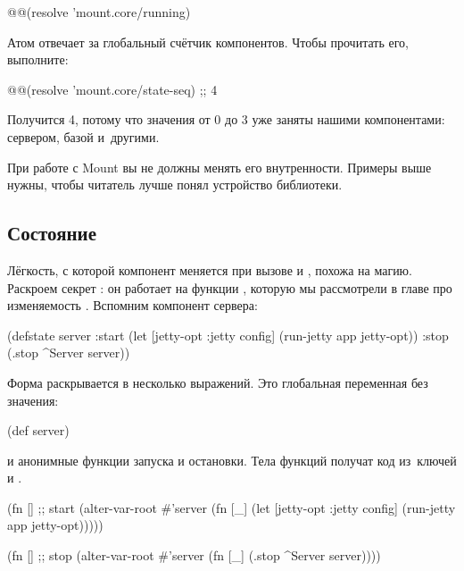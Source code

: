 \begin{clojure}
@@(resolve 'mount.core/running)
\end{clojure}

Атом  отвечает за глобальный счётчик компонентов. Чтобы
прочитать его, выполните:

\begin{clojure}
@@(resolve 'mount.core/state-seq) ;; 4
\end{clojure}

\noindent
Получится 4, потому что значения от 0 до 3 уже заняты нашими компонентами:
сервером, базой и~другими.

При работе с Mount вы не должны менять его внутренности. Примеры выше нужны,
чтобы читатель лучше понял устройство библиотеки.

\subsection{Состояние}


Лёгкость, с которой компонент меняется при вызове  и
, похожа на магию. Раскроем секрет : он работает на
функции , которую мы рассмотрели в главе про
изменяемость . Вспомним компонент сервера:

\begin{clojure}
(defstate server
  :start
  (let [{jetty-opt :jetty} config]
    (run-jetty app jetty-opt))
  :stop
  (.stop ^Server server))
\end{clojure}

Форма  раскрывается в несколько выражений. Это глобальная
переменная без значения:


\begin{clojure}
(def server)
\end{clojure}

\noindent
и анонимные функции запуска и остановки. Тела функций получат код из~ключей
 и .

\begin{clojure}
(fn [] ;; start
  (alter-var-root #'server
   (fn [_]
     (let [{jetty-opt :jetty} config]
       (run-jetty app jetty-opt)))))

(fn [] ;; stop
  (alter-var-root #'server
   (fn [_]
     (.stop ^Server server))))
\end{clojure}

